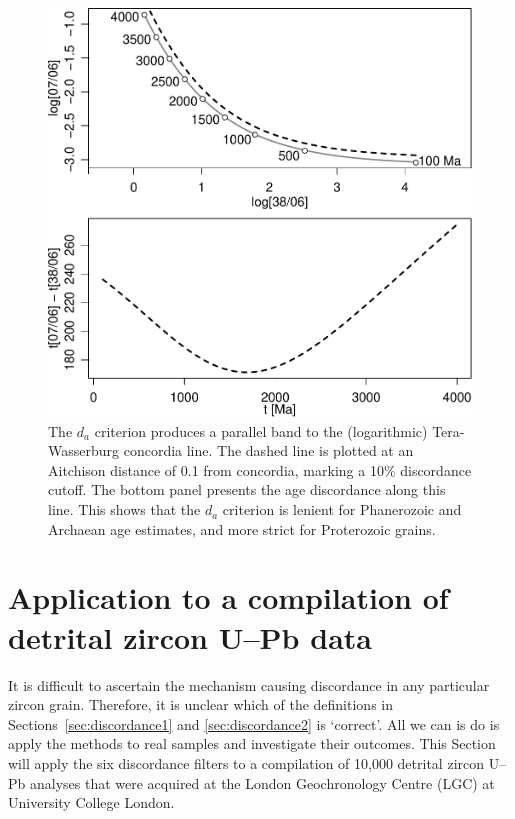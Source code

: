 \documentclass[gchron, manuscript]{copernicus}
\begin{document}
\begin{figure}
  \includegraphics[width=\textwidth]{TW-option-4.pdf}
  \caption{The $d_a$ criterion produces a parallel band to the
    (logarithmic) Tera-Wasserburg concordia line. The dashed line is
    plotted at an Aitchison distance of 0.1 from concordia, marking
    a 10\% discordance cutoff. The bottom panel presents the age
    discordance along this line. This shows that the $d_a$ criterion
    is lenient for Phanerozoic and Archaean age estimates, and more
    strict for Proterozoic grains.
  }
  \label{fig:dperp}
\end{figure}

\section{Application to a compilation of detrital zircon U--Pb data}
\label{sec:application}

It is difficult to ascertain the mechanism causing discordance in any
particular zircon grain. Therefore, it is unclear which of the
definitions in Sections~\ref{sec:discordance1} and
\ref{sec:discordance2} is `correct'. All we can is do is apply the
methods to real samples and investigate their outcomes. This Section
will apply the six discordance filters to a compilation of 10,000
detrital zircon U--Pb analyses that were acquired at the London
Geochronology Centre (LGC) at University College London.\\
\end{document}
